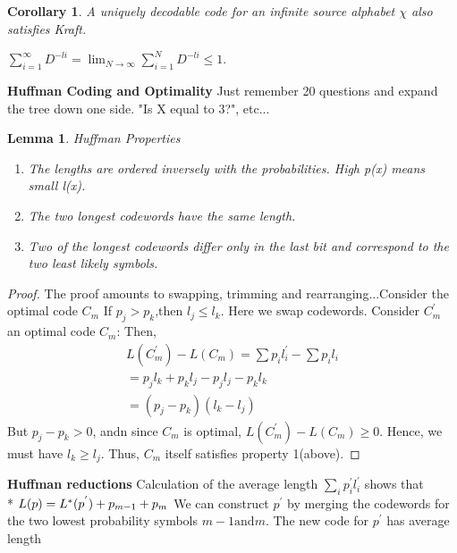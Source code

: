 \documentclass[10pt]{article}
\newtheorem{lemma}{Lemma}[section]
\newtheorem{corollary}{Corollary}[section]
\begin{document}
\begin{tiny}
\begin{multicols}{3}
\begin{corollary}A uniquely decodable code for an infinite source alphabet $\chi$ also satisfies Kraft. 
\end{corollary}

$\sum_{i=1}^{\infty}D^{-li} = \lim_{N\rightarrow\infty}\sum_{i=1}^{N}D^{-li} \leq 1$.



\textbf{\scriptsize Huffman Coding and Optimality}
Just remember 20 questions and expand the tree down one side. "Is X equal to 3?", etc...
\begin{lemma}{Huffman Properties}\label{huffman}
\begin{enumerate}
	\item {\it The lengths are ordered inversely with the probabilities. High p(x) means small l(x).}
	\item {\it The two longest codewords have the same length.}
	\item {\it Two of the longest codewords differ only in the last bit and correspond to the two least likely symbols.}
\end{enumerate}
\end{lemma}
\begin{proof} The proof amounts to swapping, trimming and rearranging...Consider the optimal code ${C_m}$
If ${p_j} > {p_k} \text{,then } {l_j} \leq {l_k}$. Here we swap codewords. Consider $C_m^{'}$ an optimal code ${C_m}$:
Then, 
\begin{eqnarray}
L(C_m^{'}) - L(C_m) = \sum {p_i}{l_i^{'}} - \sum {p_i}{l_i} \\
={p_j}{l_k}+{p_k}{l_j} - {p_j}{l_j} - {p_k}{l_k}\\
=({p_j}-{p_k})({l_k}-{l_j})
\end{eqnarray}
But ${p_j} - {p_k} > 0$, andn since ${C_m}$ is optimal, $L(C_m^{'}) - L(C_m) \geq 0$.
Hence, we must have ${l_k} \geq {l_j}$. Thus, ${C_m}$ itself satisfies property 1(above).
\end{proof}
\textbf{\scriptsize Huffman reductions}
Calculation of the average length $\sum_i {p_i^{'}}{l_i^{'}}$ shows that \\*
$L(p) = L^{*}(p^{'})+p_{m-1} + p_m\\$
We can construct ${p^{'}}$ by merging the codewords for the two lowest probability symbols
${m-1} \text{and} {m}$.  The new code for ${p^{'}}$ has average length
\begin{eqnarray}

\end{eqnarray}
\end{multicols}
\end{tiny}
\end{document}

